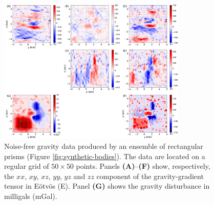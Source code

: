 \begin{figure}[htbp]
	\begin{center}
			\includegraphics[width=9cm]{Fig/noise-free-data}
		\end{center}
	\caption{
		Noise-free gravity data produced by an ensemble of rectangular prisms (Figure \ref{fig:synthetic-bodies}). 
		The data are located on a regular grid of $50 \times 50$ points. 
		Panels \textbf{(A)}--\textbf{(F)} show, respectively, the $xx$, $xy$, $xz$, $yy$, $yz$ and
		$zz$ component of the gravity-gradient tensor in Eötvös (E).
		Panel \textbf{(G)} shows the gravity disturbance in milligals (mGal).
		}
	\label{fig:noise-free-data}
\end{figure}


